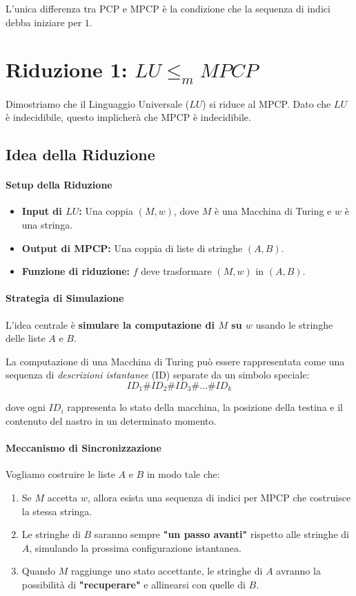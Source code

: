 \documentclass[a4paper]{article}
\theoremstyle{definition} %
\theoremstyle{remark} %
\begin{document}
L'unica differenza tra PCP e MPCP è la condizione che la sequenza di indici debba iniziare per $1$.

\section{Riduzione 1: $LU \le_m MPCP$}

Dimostriamo che il Linguaggio Universale ($LU$) si riduce al MPCP. Dato che $LU$ è indecidibile, questo implicherà che MPCP è indecidibile.

\subsection{Idea della Riduzione}

\paragraph{Setup della Riduzione}
\begin{itemize}
    \item \textbf{Input di $LU$:} Una coppia $(M, w)$, dove $M$ è una Macchina di Turing e $w$ è una stringa.
    \item \textbf{Output di MPCP:} Una coppia di liste di stringhe $(A, B)$.
    \item \textbf{Funzione di riduzione:} $f$ deve trasformare $(M, w)$ in $(A, B)$.
\end{itemize}

\paragraph{Strategia di Simulazione}
L'idea centrale è \textbf{simulare la computazione di $M$ su $w$} usando le stringhe delle liste $A$ e $B$. 

La computazione di una Macchina di Turing può essere rappresentata come una sequenza di \emph{descrizioni istantanee} (ID) separate da un simbolo speciale:
$$ID_1 \# ID_2 \# ID_3 \# \dots \# ID_k$$

dove ogni $ID_i$ rappresenta lo stato della macchina, la posizione della testina e il contenuto del nastro in un determinato momento.

\paragraph{Meccanismo di Sincronizzazione}
Vogliamo costruire le liste $A$ e $B$ in modo tale che:
\begin{enumerate}
    \item Se $M$ accetta $w$, allora esista una sequenza di indici per MPCP che costruisce la stessa stringa.
    \item Le stringhe di $B$ saranno sempre \textbf{"un passo avanti"} rispetto alle stringhe di $A$, simulando la prossima configurazione istantanea.
    \item Quando $M$ raggiunge uno stato accettante, le stringhe di $A$ avranno la possibilità di \textbf{"recuperare"} e allinearsi con quelle di $B$.
\end{enumerate}
\end{document}
